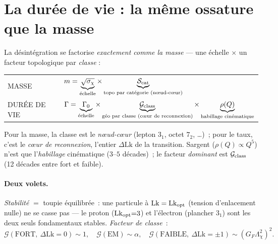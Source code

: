 \documentclass[11pt]{article}
\newcommand{\Lk}{\mathrm{Lk}}
\begin{document}
\section{La durée de vie : la même ossature que la masse}
La désintégration se factorise \emph{exactement comme la masse} --- une échelle $\times$ un facteur
topologique par \emph{classe} :
\begin{center}
\begin{tabular}{@{}ll@{}}
\toprule
MASSE & $m=\underbrace{\sqrt{\sigma_\chi}}_{\text{échelle}}\times\underbrace{\mathcal{S}_{\rm cat}}_{\text{topo par catégorie (nœud-cœur)}}$ \\[8pt]
DURÉE DE VIE & $\Gamma=\underbrace{\Gamma_0}_{\text{échelle}}\times\underbrace{\mathcal{G}_{\rm class}}_{\text{géo par classe (cœur de reconnexion)}}\times\underbrace{\rho(Q)}_{\text{habillage cinématique}}$ \\
\bottomrule
\end{tabular}
\end{center}
Pour la masse, la classe est le \emph{nœud-cœur} (lepton $3_1$, octet $7_2$, \dots)~; pour le taux,
c'est le \emph{cœur de reconnexion}, l'entier $\Delta\Lk$ de la transition. Sargent ($\rho(Q)\propto Q^5$)
n'est que l'\emph{habillage} cinématique ($3$--$5$ décades)~; le facteur \emph{dominant} est
$\mathcal{G}_{\rm class}$ (12 décades entre fort et faible).

\paragraph{Deux volets.} \emph{Stabilité} $=$ toupie équilibrée~: une particule à $\Lk=\Lk_{\rm opt}$
(tension d'enlacement nulle) ne se casse pas --- le proton ($\Lk_{\rm opt}{=}3$) et l'électron
(plancher $3_1$) sont les deux seuls fondamentaux stables. \emph{Facteur de classe}~:
\[
\mathcal{G}(\text{FORT},\ \Delta\Lk{=}0)\sim1,\quad
\mathcal{G}(\text{EM})\sim\alpha,\quad
\mathcal{G}(\text{FAIBLE},\ \Delta\Lk{=}\pm1)\sim(G_F\Lambda_\chi^2)^2 .
\]
\end{document}
